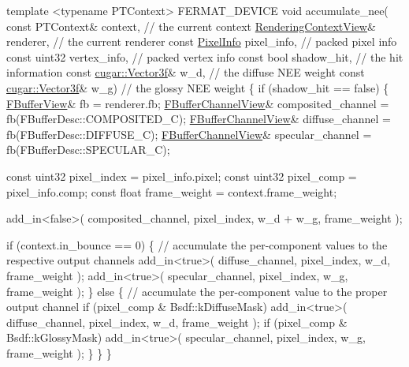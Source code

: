 \begin{DoxyCodeInclude}
    \textcolor{keyword}{template} <\textcolor{keyword}{typename} PTContext>
    FERMAT\_DEVICE
    \textcolor{keywordtype}{void} accumulate\_nee(
        \textcolor{keyword}{const} PTContext&            context,                \textcolor{comment}{// the current context}
              \hyperlink{struct_rendering_context_view}{RenderingContextView}& renderer,               \textcolor{comment}{// the current renderer}
        \textcolor{keyword}{const} \hyperlink{union_pixel_info}{PixelInfo}                pixel\_info,             \textcolor{comment}{// packed pixel info}
        \textcolor{keyword}{const} uint32                vertex\_info,            \textcolor{comment}{// packed vertex info}
        \textcolor{keyword}{const} \textcolor{keywordtype}{bool}                  shadow\_hit,             \textcolor{comment}{// the hit information}
        \textcolor{keyword}{const} \hyperlink{structcugar_1_1_vector}{cugar::Vector3f}&       w\_d,                    \textcolor{comment}{// the diffuse NEE weight}
        \textcolor{keyword}{const} \hyperlink{structcugar_1_1_vector}{cugar::Vector3f}&       w\_g)                    \textcolor{comment}{// the glossy NEE weight}
    \{
        \textcolor{keywordflow}{if} (shadow\_hit == \textcolor{keyword}{false})
        \{
            \hyperlink{struct_f_buffer_view}{FBufferView}& fb = renderer.fb;
            \hyperlink{struct_f_buffer_channel_view}{FBufferChannelView}& composited\_channel = fb(FBufferDesc::COMPOSITED\_C);
            \hyperlink{struct_f_buffer_channel_view}{FBufferChannelView}& diffuse\_channel    = fb(FBufferDesc::DIFFUSE\_C);
            \hyperlink{struct_f_buffer_channel_view}{FBufferChannelView}& specular\_channel   = fb(FBufferDesc::SPECULAR\_C);

            \textcolor{keyword}{const} uint32 pixel\_index = pixel\_info.pixel;
            \textcolor{keyword}{const} uint32 pixel\_comp  = pixel\_info.comp;
            \textcolor{keyword}{const} \textcolor{keywordtype}{float} frame\_weight = context.frame\_weight;

            add\_in<false>( composited\_channel, pixel\_index, w\_d + w\_g, frame\_weight );

            \textcolor{keywordflow}{if} (context.in\_bounce == 0)
            \{
                \textcolor{comment}{// accumulate the per-component values to the respective output channels}
                add\_in<true>( diffuse\_channel,  pixel\_index, w\_d, frame\_weight );
                add\_in<true>( specular\_channel, pixel\_index, w\_g, frame\_weight );
            \}
            \textcolor{keywordflow}{else}
            \{
                \textcolor{comment}{// accumulate the per-component value to the proper output channel}
                \textcolor{keywordflow}{if} (pixel\_comp & Bsdf::kDiffuseMask) add\_in<true>( diffuse\_channel,  pixel\_index, w\_d, 
      frame\_weight );
                \textcolor{keywordflow}{if} (pixel\_comp & Bsdf::kGlossyMask)  add\_in<true>( specular\_channel, pixel\_index, w\_g, 
      frame\_weight );
            \}
        \}
    \}
\end{DoxyCodeInclude}
